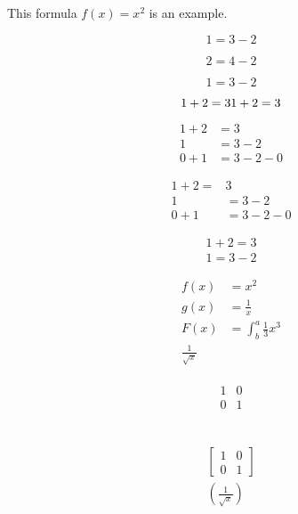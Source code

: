 \documentclass{article}
\begin{document}

This formula $f(x) = x^2$ is an example.


\begin{equation}
  1 = 3 - 2
\end{equation}

\begin{equation}
  2 = 4 - 2
\end{equation}

\begin{equation*}
  1 = 3 - 2
\end{equation*}

\begin{equation*}
  1 + 2 = 3  \\
  1 + 2 = 3 
\end{equation*}

\begin{align*}
  1 + 2 &= 3\\
  1 &= 3 - 2\\
  0+ 1 &= 3 - 2 - 0
\end{align*}

\begin{align*}
  1 + 2 = &3\\
  1 &= 3 - 2\\
  0+ 1 &= 3 - 2 - 0
\end{align*}

\begin{align*}
  1 + 2 = 3\\
  1 = 3 - 2
\end{align*}


\begin{align*}
  f(x) &= x^2\\
  g(x) &= \frac{1}{x}\\
  F(x) &= \int^a_b \frac{1}{3}x^3\\
  \frac{1}{\sqrt{x}}
\end{align*}

\begin{align*}    %
  \begin{matrix}
  1 & 0\\
  0 & 1
  \end{matrix}    %
\end{align*}

\begin{align*}    %
  [
  \begin{matrix}
  1 & 0\\
  0 & 1
  \end{matrix}    %
  ]
\end{align*}

\begin{align*}    %
  \left[
  \begin{matrix}
  1 & 0\\
  0 & 1
  \end{matrix}    %
  \right] \\
  \left(\frac{1}{\sqrt{x}}\right)
\end{align*}
\end{document}
